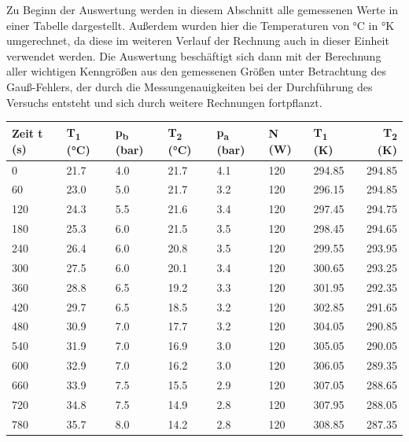 \documentclass[titlepage=firstcover, captions=tableheading]{scrartcl}
\begin{document}
Zu Beginn der Auswertung werden in diesem Abschnitt alle gemessenen Werte in einer Tabelle dargestellt. Außerdem wurden hier die Temperaturen von °C in °K umgerechnet,
da diese im weiteren Verlauf der Rechnung auch in dieser Einheit verwendet werden.
Die Auswertung beschäftigt sich dann mit der Berechnung aller wichtigen Kenngrößen aus den gemessenen Größen unter Betrachtung des Gauß-Fehlers, 
der durch die Messungenauigkeiten bei der Durchführung des Versuchs entsteht und sich durch weitere Rechnungen fortpflanzt. 
\noindent
\begin{minipage}{\linewidth}
\begin{center}
        \begin{tabular}{lllllllr}  
            \toprule
            Zeit t (s)    & T\textsubscript{1} (°C) & p\textsubscript{b} (bar) & T\textsubscript{2} (°C) & p\textsubscript{a} (bar) & N (W) & T\textsubscript{1} (K) 
            & T\textsubscript{2} (K) \\
            \midrule
            0   	&   21.7 & 4.0 &    21.7 &  4.1 &   120   & 294.85 & 294.85 \\
            60  	&   23.0 & 5.0 &	21.7 &  3.2	&   120   & 296.15 & 294.85  \\
            120 	&   24.3 & 5.5 &	21.6 &	3.4	&   120   & 297.45 & 294.75  \\
            180 	&   25.3 & 6.0 &	21.5 &	3.5	&   120   & 298.45 &  294.65 \\
            240 	&   26.4 & 6.0 & 	20.8 &	3.5	&   120   & 299.55 & 293.95  \\
            300 	&   27.5 & 6.0 & 	20.1 &	3.4 &	120   & 300.65 & 293.25  \\
            360 	&   28.8 & 6.5 & 	19.2 &	3.3 &	120   & 301.95 & 292.35  \\
            420 	&   29.7 & 6.5 & 	18.5 &	3.2 &	120   & 302.85 & 291.65  \\
            480 	&   30.9 & 7.0 & 	17.7 &	3.2 &	120   & 304.05 & 290.85  \\
            540 	&   31.9 & 7.0 & 	16.9 &	3.0 &	120   & 305.05 & 290.05  \\
            600 	&   32.9 & 7.0 & 	16.2 &	3.0 &	120   & 306.05 & 289.35    \\
            660 	&   33.9 & 7.5 & 	15.5 &	2.9 &	120   & 307.05 & 288.65  \\
            720 	&   34.8 & 7.5 &	14.9 &	2.8 &	120   & 307.95 & 288.05  \\
            780 	&   35.7 & 8.0 & 	14.2 &	2.8 &	120   & 308.85 & 287.35 \\

\end{tabular}
\end{center}
\end{minipage}
\end{document}

